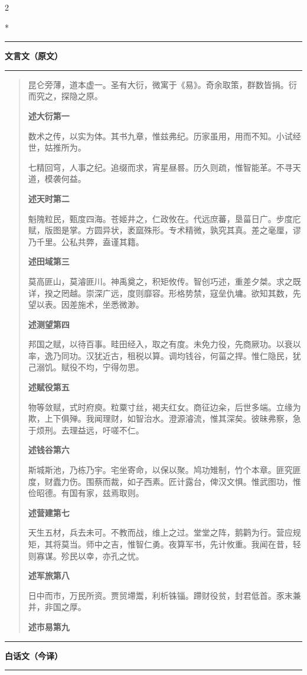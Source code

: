 \documentclass[11pt,a4paper]{article}
\newenvironment{preface}{%
  \begin{quote}\color{prefacecolor}%
}{\end{quote}}
\newcommand{\leftcolheader}{%
  \noindent\textcolor{leftheader}{\rule{\columnwidth}{1.5pt}}\par
  \vspace{2pt}
  \noindent\textbf{\color{leftheader}\chinese 文言文（原文）}\par
  \vspace{2pt}
  \noindent\textcolor{leftheader}{\rule{\columnwidth}{0.6pt}}\par
  \vspace{4pt}
}
\newcommand{\rightcolheader}{%
  \noindent\textcolor{rightheader}{\rule{\columnwidth}{1.5pt}}\par
  \vspace{2pt}
  \noindent\textbf{\color{rightheader}\chinese 白话文（今译）}\par
  \vspace{2pt}
  \noindent\textcolor{rightheader}{\rule{\columnwidth}{0.6pt}}\par
  \vspace{4pt}
}
\begin{document}
\begin{paracol}{2}

\switchcolumn[0]*\leftcolheader

\begin{preface}
昆仑旁薄，道本虚一。圣有大衍，微寓于《易》。奇余取策，群数皆捐。衍而究之，探隐之原。

\textbf{述大衍第一}

数术之传，以实为体。其书九章，惟兹弗纪。历家虽用，用而不知。小试经世，姑推所为。

七精回穹，人事之纪。追缀而求，宵星昼晷。历久则疏，惟智能革。不寻天道，模袭何益。

\textbf{述天时第二}

魁隗粒民，甄度四海。苍姬井之，仁政攸在。代远庶蕃，垦菑日广。步度庀赋，版图是掌。方圆异状，袤窳殊形。专术精微，孰究其真。差之毫厘，谬乃千里。公私共弊，盍谨其籍。

\textbf{述田域第三}

莫高匪山，莫濬匪川。神禹奠之，积矩攸传。智创巧述，重差夕桀。求之既详，揆之罔越。崇深广远，度则靡容。形格势禁，寇垒仇墉。欲知其数，先望以表。因差施术，坐悉微渺。

\textbf{述测望第四}

邦国之赋，以待百事。畦田经入，取之有度。未免力役，先商厥功。以衰以率，逸乃同功。汉犹近古，租税以算。调均钱谷，何菑之捍。惟仁隐民，犹己溺饥。赋役不均，宁得勿思。

\textbf{述赋役第五}

物等敛赋，式时府庾。粒粟寸丝，褐夫红女。商征边籴，后世多端。立缘为欺，上下俱殚。我闻理财，如智治水。澄源濬流，惟其深矣。彼昧弗察，急于烦刑。去理益远，吁嗟不仁。

\textbf{述钱谷第六}

斯城斯池，乃栋乃宇。宅坐寄命，以保以聚。鸠功雉制，竹个本章。匪究匪度，财蠹力伤。围蔡而裁，如子西素。匠计露台，俾汉文惧。惟武图功，惟俭昭德。有国有家，兹焉取则。

\textbf{述营建第七}

天生五材，兵去未可。不教而战，维上之过。堂堂之阵，鹅鹳为行。营应规矩，其将莫当。师中之吉，惟智仁勇。夜算军书，先计攸重。我闻在昔，轻则寡谋。殄民以幸，亦孔之忧。

\textbf{述军旅第八}

日中而市，万民所资。贾贸墆鬻，利析铢锱。蹛财役贫，封君低首。豕末兼并，非国之厚。

\textbf{述市易第九}
\end{preface}

\switchcolumn\rightcolheader


\end{paracol}
\end{document}
